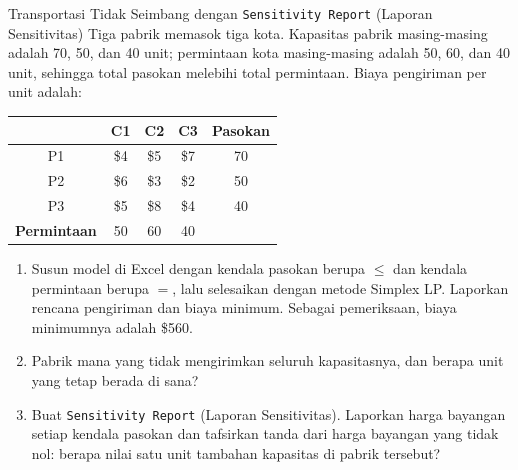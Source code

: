 \begin{ex}{Transportasi Tidak Seimbang dengan \texttt{Sensitivity Report} (Laporan Sensitivitas)}{}
\label{ex:excel-unbalanced-transportation}
 Tiga pabrik memasok tiga kota.  Kapasitas pabrik masing-masing adalah 70, 50, dan 40 unit; permintaan kota masing-masing adalah 50, 60, dan 40 unit, sehingga total pasokan melebihi total permintaan.  Biaya pengiriman per unit adalah:

\begin{center}
\begin{tabular}{c|c|c|c|c}
 & C1 & C2 & C3 & \textbf{Pasokan} \\
\hline
P1 & \$4 & \$5 & \$7 & 70 \\
P2 & \$6 & \$3 & \$2 & 50 \\
P3 & \$5 & \$8 & \$4 & 40 \\
\hline
\textbf{Permintaan} & 50 & 60 & 40 & \\
\end{tabular}
\par{}\label{tab:software-excel-tab05}%

\end{center}

\begin{enumerate}
\item Susun model di Excel dengan kendala pasokan berupa $\leq$ dan kendala permintaan berupa $=$, lalu selesaikan dengan metode Simplex LP.  Laporkan rencana pengiriman dan biaya minimum.  Sebagai pemeriksaan, biaya minimumnya adalah \$560.
\item Pabrik mana yang tidak mengirimkan seluruh kapasitasnya, dan berapa unit yang tetap berada di sana?
\item Buat \texttt{Sensitivity Report} (Laporan Sensitivitas).  Laporkan harga bayangan setiap kendala pasokan dan tafsirkan tanda dari harga bayangan yang tidak nol: berapa nilai satu unit tambahan kapasitas di pabrik tersebut?
\end{enumerate}
\exrefs{\S\ref{sec:excel-solver}, \OOExcelTransportationSectionReference}
\end{ex}


